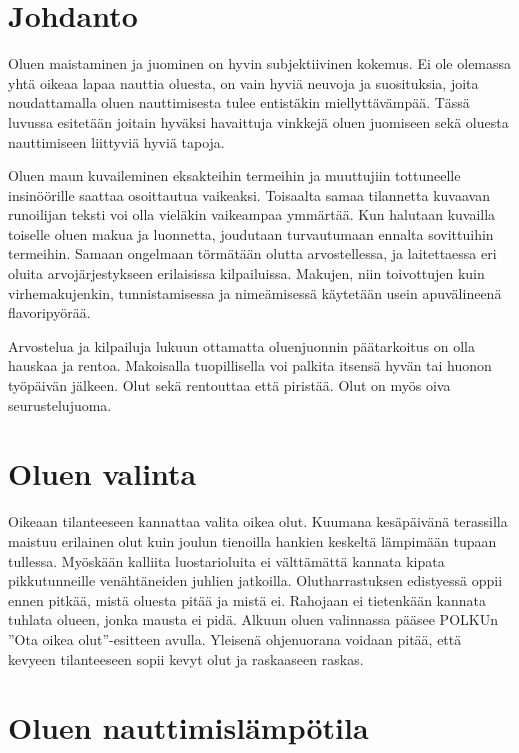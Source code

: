 \documentclass[a4paper,11pt]{report}
\begin{document}
\section{Johdanto}

Oluen maistaminen ja juominen on hyvin subjektiivinen kokemus. Ei ole olemassa yhtä oikeaa lapaa nauttia oluesta, on vain hyviä neuvoja ja suosituksia, joita noudattamalla oluen nauttimisesta tulee entistäkin miellyttävämpää. Tässä luvussa esitetään joitain hyväksi havaittuja vinkkejä oluen juomiseen sekä oluesta nauttimiseen liittyviä hyviä tapoja.

Oluen maun kuvaileminen eksakteihin termeihin ja muuttujiin tottuneelle insinöörille saattaa osoittautua vaikeaksi. Toisaalta samaa tilannetta kuvaavan runoilijan teksti voi olla vieläkin vaikeampaa ymmärtää. Kun halutaan kuvailla toiselle oluen makua ja luonnetta, joudutaan turvautumaan ennalta sovittuihin termeihin. Samaan ongelmaan törmätään olutta arvostellessa, ja laitettaessa eri oluita arvojärjestykseen erilaisissa kilpailuissa. Makujen, niin toivottujen kuin virhemakujenkin, tunnistamisessa ja nimeämisessä käytetään usein apuvälineenä flavoripyörää.

Arvostelua ja kilpailuja lukuun ottamatta oluenjuonnin päätarkoitus on olla hauskaa ja rentoa. Makoisalla tuopillisella voi palkita itsensä hyvän tai huonon työpäivän jälkeen. Olut sekä rentouttaa että piristää. Olut on myös oiva seurustelujuoma.

\section{Oluen valinta}

Oikeaan tilanteeseen kannattaa valita oikea olut. Kuumana kesäpäivänä terassilla maistuu erilainen olut kuin joulun tienoilla hankien keskeltä lämpimään tupaan tullessa. Myöskään kalliita luostarioluita ei välttämättä kannata kipata pikkutunneille venähtäneiden juhlien jatkoilla. Olutharrastuksen edistyessä oppii ennen pitkää, mistä oluesta pitää ja mistä ei. Rahojaan ei tietenkään kannata tuhlata olueen, jonka mausta ei pidä. Alkuun oluen valinnassa pääsee POLKUn ''Ota oikea olut''-esitteen avulla. Yleisenä ohjenuorana voidaan pitää, että kevyeen tilanteeseen sopii kevyt olut ja raskaaseen raskas.

\section{Oluen nauttimislämpötila}
\end{document}
